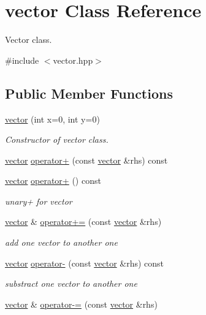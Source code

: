\hypertarget{classvector}{}\section{vector Class Reference}
\label{classvector}


Vector class.  




{\ttfamily \#include $<$vector.\+hpp$>$}

\subsection*{Public Member Functions}
\begin{DoxyCompactItemize}
\item 
\hyperlink{classvector_ada69c108ec9393e6f70bdfcd58366cbf}{vector} (int x=0, int y=0)
\begin{DoxyCompactList}\small\item\em Constructor of vector class. \end{DoxyCompactList}\item 
\hyperlink{classvector}{vector} \hyperlink{classvector_a9d639bc53d77f17c6ba3af1dd9549424}{operator+} (const \hyperlink{classvector}{vector} \&rhs) const
\item 
\hyperlink{classvector}{vector} \hyperlink{classvector_a9af16b41f973cd073b089bf5371e8a70}{operator+} () const
\begin{DoxyCompactList}\small\item\em unary+ for vector \end{DoxyCompactList}\item 
\hyperlink{classvector}{vector} \& \hyperlink{classvector_a401c12597814627f350a8cd663b6dba5}{operator+=} (const \hyperlink{classvector}{vector} \&rhs)
\begin{DoxyCompactList}\small\item\em add one vector to another one \end{DoxyCompactList}\item 
\hyperlink{classvector}{vector} \hyperlink{classvector_a35999c3c2b222c116a4a8fca73cda8a9}{operator-\/} (const \hyperlink{classvector}{vector} \&rhs) const
\begin{DoxyCompactList}\small\item\em substract one vector to another one \end{DoxyCompactList}\item 
\hyperlink{classvector}{vector} \& \hyperlink{classvector_a9229a3d50eae5ce544f81419d49540ce}{operator-\/=} (const \hyperlink{classvector}{vector} \&rhs)

\end{DoxyCompactItemize}
